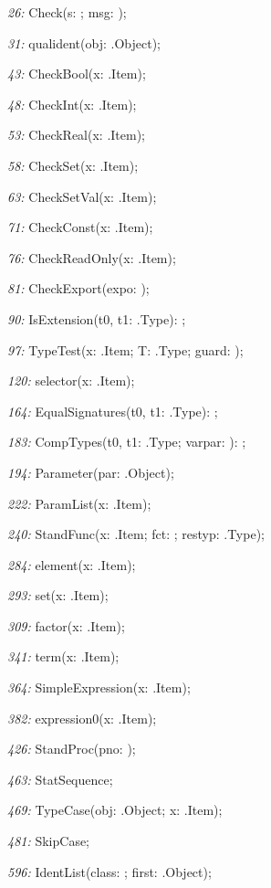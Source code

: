 \item{\it 26:} Check(s: \INTEGER; msg: \ARRAYOF\CHAR);
\item{\it 31:} qualident(\VAR obj: \ORB.Object);
\item{\it 43:} CheckBool(\VAR x: \ORG.Item);
\item{\it 48:} CheckInt(\VAR x: \ORG.Item);
\item{\it 53:} CheckReal(\VAR x: \ORG.Item);
\item{\it 58:} CheckSet(\VAR x: \ORG.Item);
\item{\it 63:} CheckSetVal(\VAR x: \ORG.Item);
\item{\it 71:} CheckConst(\VAR x: \ORG.Item);
\item{\it 76:} CheckReadOnly(\VAR x: \ORG.Item);
\item{\it 81:} CheckExport(\VAR expo: \BOOLEAN);
\item{\it 90:} IsExtension(t0, t1: \ORB.Type): \BOOLEAN;
\item{\it 97:} TypeTest(\VAR x: \ORG.Item; T: \ORB.Type; guard: \BOOLEAN);
\item{\it 120:} selector(\VAR x: \ORG.Item);
\item{\it 164:} EqualSignatures(t0, t1: \ORB.Type): \BOOLEAN;
\item{\it 183:} CompTypes(t0, t1: \ORB.Type; varpar: \BOOLEAN): \BOOLEAN;
\item{\it 194:} Parameter(par: \ORB.Object);
\item{\it 222:} ParamList(\VAR x: \ORG.Item);
\item{\it 240:} StandFunc(\VAR x: \ORG.Item; fct: \LONGINT; restyp: \ORB.Type);
\item{\it 284:} element(\VAR x: \ORG.Item);
\item{\it 293:} set(\VAR x: \ORG.Item);
\item{\it 309:} factor(\VAR x: \ORG.Item);
\item{\it 341:} term(\VAR x: \ORG.Item);
\item{\it 364:} SimpleExpression(\VAR x: \ORG.Item);
\item{\it 382:} expression0(\VAR x: \ORG.Item);
\item{\it 426:} StandProc(pno: \LONGINT);
\item{\it 463:} StatSequence;
\item{\it 469:} TypeCase(obj: \ORB.Object; \VAR x: \ORG.Item);
\item{\it 481:} SkipCase;
\item{\it 596:} IdentList(class: \INTEGER; \VAR first: \ORB.Object);
